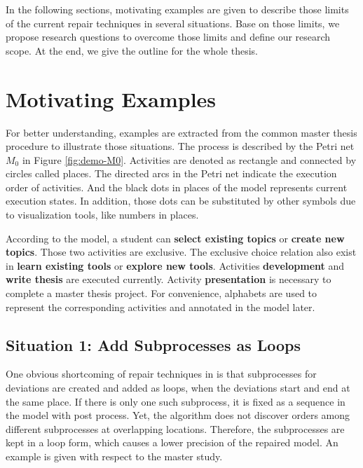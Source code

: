 In the following sections, motivating examples are given to describe those limits of the current repair techniques in several situations. Base on those limits, we propose research questions to overcome those limits and define our research scope. At the end, we give the outline for the whole thesis.
\section{Motivating Examples}\label{sec:demo}

For better understanding, examples are extracted from the common master thesis procedure to illustrate those situations. The process is described by the Petri net $M_0$ in Figure \ref{fig:demo-M0}. Activities are denoted as rectangle and connected by circles called places. The directed arcs in the Petri net indicate the execution order of activities. And the black dots in places of the model represents current execution states. In addition, those dots can be substituted by other symbols due to visualization tools, like numbers in places.

According to the model, a student can \textbf{select existing topics}  or \textbf{create new topics}. Those two activities are exclusive. The exclusive choice relation also exist in  \textbf{learn existing tools}  or \textbf{explore new tools}. Activities \textbf{development} and  \textbf{write thesis} are executed currently. Activity \textbf{presentation} is necessary to complete a master thesis project. For convenience, alphabets are used to represent the corresponding activities and annotated in the model later.

\subsection{Situation 1: \small{Add Subprocesses as Loops}} %
One obvious shortcoming of repair techniques in \cite{fahland2015model} is that subprocesses for  deviations are created and added as loops, when the deviations start and end at the same place. If there is only one such subprocess, it is fixed as a sequence in the model with post process. Yet, the algorithm does not discover orders among different subprocesses at overlapping locations. Therefore, the subprocesses are kept in a loop form, which causes a lower precision of the repaired model. An example is given with respect to the master study. 

